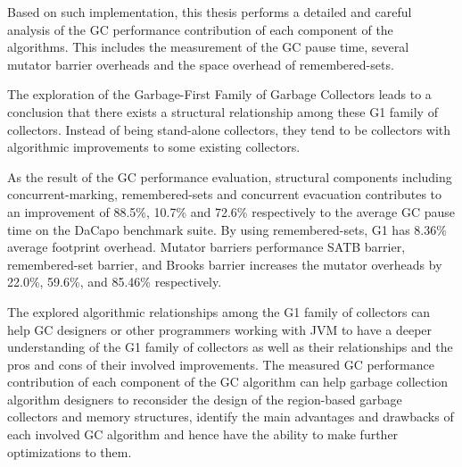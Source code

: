 Based on such implementation, this thesis performs a detailed
and careful analysis of the GC performance contribution of each component of the algorithms.
This includes the measurement of the GC pause time, several mutator barrier overheads
and the space overhead of remembered-sets.


The exploration of the Garbage-First Family of Garbage Collectors leads to a conclusion
that there exists a structural relationship among these G1 family of collectors.
Instead of being stand-alone collectors, they tend to be collectors with
algorithmic improvements to some existing collectors.

As the result of the GC performance evaluation,
structural components including concurrent-marking, remembered-sets and concurrent
evacuation contributes to an improvement of 88.5\%, 10.7\% and 72.6\%
respectively to the average GC pause time on the DaCapo benchmark suite.
By using remembered-sets, G1 has 8.36\% average footprint overhead.
Mutator barriers performance SATB barrier, remembered-set barrier,
and Brooks barrier increases the mutator overheads by 22.0\%, 59.6\%, and 85.46\%
respectively.


The explored algorithmic relationships among the G1 family of collectors can help
GC designers or other programmers working with JVM to have a deeper understanding of
the G1 family of collectors as well as their relationships and the pros and cons of their involved improvements.
The measured GC performance contribution of each component of the GC algorithm
can help garbage collection algorithm designers to reconsider the design of 
the region-based garbage collectors and memory structures, identify
the main advantages and drawbacks of each involved GC algorithm and
hence have the ability to make further optimizations to them.

